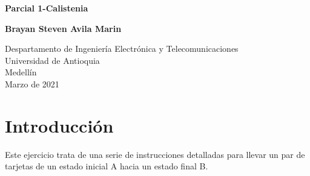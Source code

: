 \documentclass{article}
\begin{document}
\begin{titlepage}
    \begin{center}
        \vspace*{1cm}
            
        \Huge
        \textbf{Parcial 1-Calistenia}
            
        \vspace{0.5cm}
        \LARGE
        
            
        \vspace{1.5cm}
            
        \textbf{Brayan Steven Avila Marin}
            
        \vfill
            
        \vspace{0.8cm}
            
        \Large
        Despartamento de Ingeniería Electrónica y Telecomunicaciones\\
        Universidad de Antioquia\\
        Medellín\\
        Marzo de 2021
            
    \end{center}
\end{titlepage}

\tableofcontents
\newpage
\section{Introducción}\label{intro}
Este ejercicio trata de una serie de instrucciones detalladas para llevar un par de tarjetas de un estado inicial A hacia un estado final B.
\end{document}
